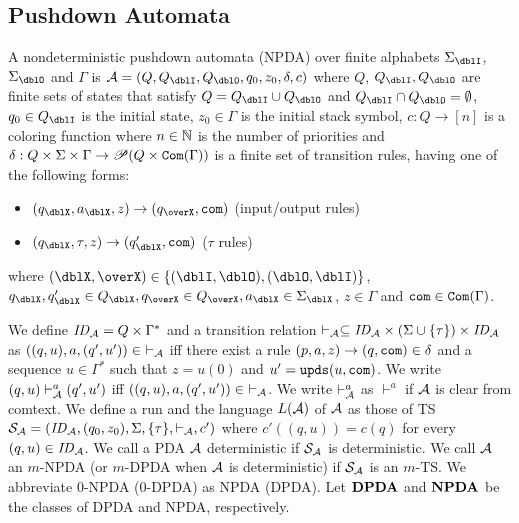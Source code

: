 \subsection{Pushdown Automata}

\begin{definition}
A nondeterministic {pushdown automata} (NPDA) over finite alphabets $\Sigma_\dblI$, $\Sigma_\dblO$ and $\Gamma$ is $\calA = (Q, Q_\dblI, Q_\dblO, q_0, z_0, \delta, c)$ where
$Q$, $Q_\dblI, Q_\dblO$ are finite sets of states that satisfy $Q=Q_\dblI\cup Q_\dblO$ and $Q_\dblI \cap Q_\dblO = \emptyset$,
$q_0\in Q_\dblI$ is the initial state,
$z_0\in \Gamma$ is the initial stack symbol,
$c: Q \to [n]$ is a coloring function where $n\in \mathbb{N}$ is the number of priorities and
$\delta: Q \times \Sigma \times \Gamma \to \mathscr{P}(Q \times \mathtt{Com}(\Gamma))$ is a finite set of transition rules, having one of the following forms:
\begin{itemize}
\item $(q_\dblX, a_\dblX, z) \rightarrow (q_\overX, \com)$ (input/output rules)
\item $(q_\dblX, \tau, z)\to(q'_\dblX,\com)$ ($\tau$ rules)
\end{itemize}
where $(\dblX, \overX)\in\{(\dblI, \dblO), (\dblO,\dblI)\}$,
$q_\dblX, q'_\dblX\in Q_\dblX, q_\overX\in Q_\overX, a_\dblX\in \Sigma_\dblX$, $z\in \Gamma$ and $\mathtt{com}\in \mathtt{Com}(\Gamma)$.
\end{definition}
We define $\mathit{ID}_{\cal A}= Q\times \Gamma^*$ and
a transition relation $\vdash_{\cal A}\subseteq \mathit{ID}_{\cal A}\times (\Sigma\cup\{\tau\})\times \mathit{ID}_{\cal A}$ as
$((q,u),a,(q',u'))\in\ \vdash_{\cal A}$ iff there exist a rule $(p, a, z) \rightarrow (q, \mathtt{com}) \in \delta$ and a sequence $u\in \Gamma^*$ such that $z=u(0)$ and $u'=\mathtt{upds}(u,\mathtt{com})$.
We write $(q,u)\vdash^a_{\cal A}(q',u')$ iff
$((q,u),a,(q',u'))\in\ \vdash_{\cal A}$.
We write $\vdash^{a}_{\cal A}$ as $\vdash^{a}$ if ${\cal A}$ is clear from comtext.
We define a run and the language $L({\cal A})$ of ${\cal A}$ as those of TS ${\cal S}_{\cal A}=(\mathit{ID}_{\cal A}, (q_0,z_0),\Sigma, \{\tau\},\vdash_{\cal A},c')$
where $c'((q,u))= c(q)$ for every $(q,u)\in\mathit{ID}_{\cal A}$.
We call a PDA ${\cal A}$ deterministic if ${\cal S}_{\cal A}$ is deterministic.
We call ${\cal A}$ an $m$-NPDA (or $m$-DPDA when ${\cal A}$ is deterministic)
if ${\cal S}_{\cal A}$ is an $m$-TS.
We abbreviate $0$-NPDA ($0$-DPDA) as NPDA (DPDA).
Let ${\bf DPDA}$ and ${\bf NPDA}$ be the classes of DPDA and NPDA, respectively.

